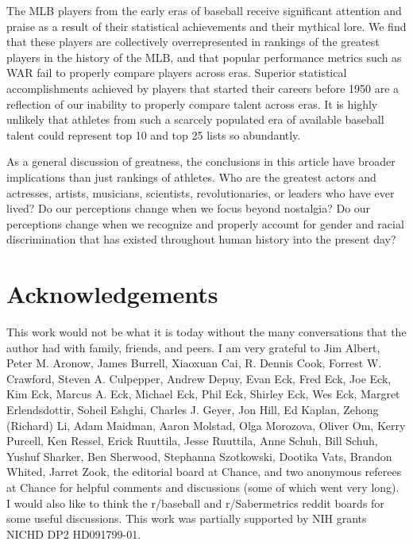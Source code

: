\documentclass[11pt]{article}\usepackage[]{graphicx}\usepackage[]{color}
\begin{document}
The MLB players from the early eras of baseball receive significant attention 
and praise as a result of their statistical achievements and their mythical 
lore.  We find that these players are collectively overrepresented in 
rankings of the greatest players in the history of the MLB, and that popular 
performance metrics such as WAR fail to properly compare players across eras.  
Superior statistical accomplishments achieved 
by players that started their careers before 1950 are a reflection of our 
inability to properly compare talent across eras.  It is highly unlikely that 
athletes from such a scarcely populated era of available baseball talent 
could represent top 10 and top 25 lists so abundantly. 


As a general discussion of greatness, the conclusions in this article have 
broader implications than just rankings of athletes. 
Who are the greatest  
actors and actresses, 
artists,
musicians, 
scientists, 
revolutionaries,
or 
leaders who have ever lived?  
Do our perceptions change when we focus beyond nostalgia?  
Do our perceptions change when we recognize and properly account for 
gender and racial discrimination that has existed throughout human 
history into the present day?   



\section*{Acknowledgements}

This work would not be what it is today without the many conversations that 
the author had with family, friends, and peers.
I am very grateful to 
Jim Albert, 
Peter M. Aronow, 
James Burrell, 
Xiaoxuan Cai, 
R. Dennis Cook, 
Forrest W. Crawford, 
Steven A. Culpepper, 
Andrew Depuy, 
Evan Eck, 
Fred Eck, 
Joe Eck,
Kim Eck, 
Marcus A. Eck, 
Michael Eck, 
Phil Eck, 
Shirley Eck, 
Wes Eck, 
Margret Erlendsdottir, 
Soheil Eshghi, 
Charles J. Geyer, 
Jon Hill,
Ed Kaplan, 
Zehong (Richard) Li, 
Adam Maidman, 
Aaron Molstad, 
Olga Morozova, 
Oliver Om, 
Kerry Purcell, 
Ken Ressel, 
Erick Ruuttila, 
Jesse Ruuttila, 
Anne Schuh, 
Bill Schuh, 
Yushuf Sharker, 
Ben Sherwood, 
Stephanna Szotkowski,
Dootika Vats,
Brandon Whited,
Jarret Zook,
the editorial board at Chance, 
and 
two anonymous referees at Chance
for helpful comments and discussions (some of which went very long).  
I would also like to think the r/baseball and r/Sabermetrics reddit boards 
for some useful discussions.  
This work was partially supported by NIH grants NICHD DP2 HD091799-01.
\end{document}

